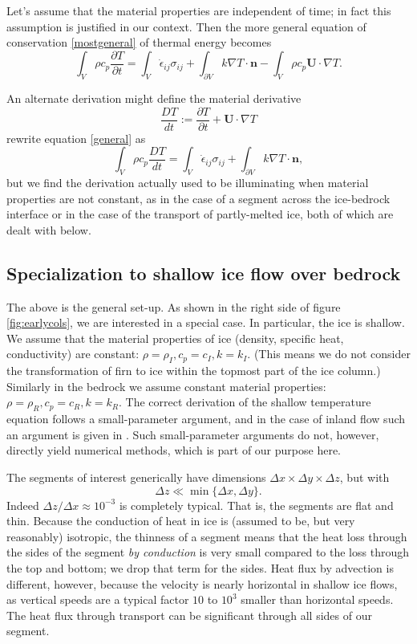 \documentclass[12pt,final]{amsart}%
\theoremstyle{plain}
\theoremstyle{definition}
\theoremstyle{remark}
\newcommand{\ddt}[1]{\ensuremath{\frac{\partial #1}{\partial t}}}
\def\eps{\epsilon}
\newcommand{\grad}{\nabla}
\newcommand{\nhat}{\mathbf{n}}
\newcommand{\bU}{{\mathbf{U}}}
\begin{document}
Let's assume that the material properties are independent of time; in fact this assumption is justified in our context.  Then the more general equation of conservation \eqref{mostgeneral} of thermal energy becomes
\begin{equation}\label{general}
\int_V \rho c_p \ddt{T} = \int_V \dot \eps_{ij} \sigma_{ij} + \int_{\partial V} k \grad T \cdot \nhat - \int_V \rho c_p \bU \cdot \grad T.
\end{equation}

An alternate derivation might define the material derivative
    $$\frac{D T}{dt} := \ddt{T} + \bU\cdot \grad T$$
rewrite equation \eqref{general} as
    $$\int_V \rho c_p \frac{D T}{dt} = \int_V \dot \eps_{ij} \sigma_{ij} + \int_{\partial V} k \grad T \cdot \nhat,$$
but we find the derivation actually used to be illuminating when material properties are not constant, as in the case of a segment across the ice-bedrock interface or in the case of the transport of partly-melted ice, both of which are dealt with below.


\subsection*{Specialization to shallow ice flow over bedrock}  The above is the general set-up.  As shown in the right side of figure \ref{fig:earlycols}, we are interested in a special case.  In particular, the ice is shallow.  We assume that the material properties of ice (density, specific heat, conductivity) are constant: $\rho=\rho_I,c_p=c_I,k=k_I$.  (This means we do not consider the transformation of firn to ice within the topmost part of the ice column.)  Similarly in the bedrock we assume constant material properties: $\rho=\rho_R,c_p=c_R,k =k_R$.  The correct derivation of the shallow temperature equation follows a small-parameter argument, and in the case of inland flow such an argument is given in \citep{Fowler}.  Such small-parameter arguments do not, however, directly yield numerical methods, which is part of our purpose here.

The segments of interest generically have dimensions $\Delta x \times \Delta y \times \Delta z$, but with
    $$\Delta z \ll \min\{\Delta x, \Delta y\}.$$
Indeed $\Delta z / \Delta x \approx 10^{-3}$ is completely typical.  That is, the segments are flat and thin.  Because the conduction of heat in ice is (assumed to be, but very reasonably) isotropic, the thinness of a segment means that the heat loss through the sides of the segment \emph{by conduction} is very small compared to the loss through the top and bottom; we drop that term for the sides.  Heat flux by advection is different, however, because the velocity is nearly horizontal in shallow ice flows, as vertical speeds are a typical factor $10$ to $10^3$ smaller than horizontal speeds.  The heat flux through transport can be significant through all sides of our segment.
\end{document}
